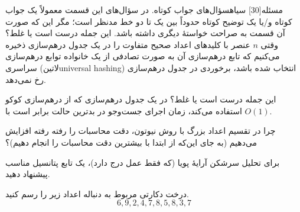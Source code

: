 ‌مسئله[30] ‌سیاه{سؤال‌های جواب کوتاه.} در سؤال‌های این قسمت معمولاً یک جواب کوتاه و/یا یک توضیح کوتاه حدوداً بین یک تا دو خط مدنظر است؛ مگر این که صورت آن قسمت به صراحت خواستۀ دیگری داشته باشد.
این جمله درست است یا غلط؟
وقتی $n$ عنصر با کلیدهای اعداد صحیح متفاوت را در یک جدول درهم‌سازی ذخیره می‌کنیم که تابع درهم‌سازی آن به صورت تصادفی از یک خانواده توابع درهم‌سازی سراسری (‌لاتین{universal hashing}) انتخاب شده باشد، برخوردی در جدول درهم‌سازی رخ نمی‌دهد.


این جمله درست است یا غلط؟
در یک جدول درهم‌سازی که از درهم‌سازی کوکو استفاده می‌کند، زمان اجرای جست‌وجو در بدترین حالت برابر است با $O(1)$.


چرا در تقسیم اعداد بزرگ با روش نیوتون، دقت محاسبات را رفته رفته افزایش می‌دهیم (به جای این‌که از ابتدا با بیشترین دقت محاسبات را انجام دهیم)؟


برای تحلیل سرشکن آرایۀ پویا (که فقط عمل درج دارد)، یک تابع پتانسیل مناسب پیشنهاد دهید.


درخت دکارتی مربوط به دنباله اعداد زیر را رسم کنید.
\begin{equation*}
6, 9, 2, 4, 7, 8, 5, 8, 3, 7
\end{equation*}


%
%
%
%
%	
%
%
%
%
%
%
%	

